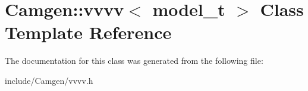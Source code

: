 \hypertarget{a00595}{}\section{Camgen\+:\+:vvvv$<$ model\+\_\+t $>$ Class Template Reference}
\label{a00595}


The documentation for this class was generated from the following file\+:\begin{DoxyCompactItemize}
\item 
include/\+Camgen/vvvv.\+h\end{DoxyCompactItemize}
